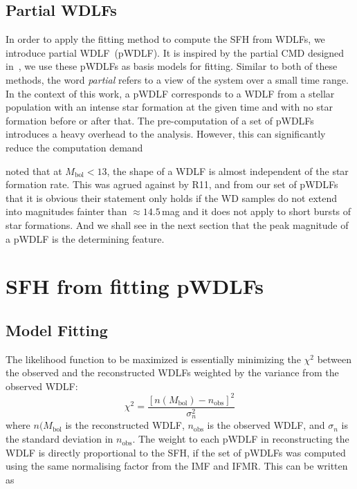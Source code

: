\documentclass[fleqn,usenatbib]{mnras}
\begin{document}
\subsection*{Partial WDLFs}
In order to apply the fitting method to compute the SFH from WDLFs, we introduce
partial WDLF~(pWDLF). It is inspired by the partial CMD designed
in~\citep{2006A&A...459..783C}, we use these pWDLFs as basis models
for fitting. Similar to both of these methods, the word \textit{partial} 
refers to a view of the system over a small time range. In the context of this
work, a pWDLF corresponds to a WDLF from a stellar population with an intense
star formation at the given time and with no star formation before or after
that. The pre-computation of a set of pWDLFs introduces a heavy overhead to the
analysis. However, this can significantly reduce the computation demand 

\citet{2008ApJ...682L.109I} noted that at $M_{\mathrm{bol}} < 13$, the shape of
a WDLF is almost independent of the star formation rate. This was agrued
against by R11, and from our set of pWDLFs that it is obvious their statement
only holds if the WD samples do not extend into magnitudes fainter than
$\approx14.5$\,mag and it does not apply to short bursts of star formations.
And we shall see in the next section that the peak magnitude of a pWDLF is the
determining feature.

\section{SFH from fitting pWDLFs}

\subsection{Model Fitting}
\label{sec:model_fitting}
The likelihood function to be maximized is essentially minimizing the $\chi^2$
between the observed and the reconstructed WDLFs weighted by the variance from
the observed WDLF:
\begin{equation}
    \chi^2 = \frac{\left[n(M_\mathrm{bol}) - n_\mathrm{obs}\right]^2}{\sigma_n^2}
\end{equation}
where $n(M_\mathrm{bol}$ is the reconstructed WDLF, $n_\mathrm{obs}$ is the
observed WDLF, and $\sigma_n$ is the standard deviation in $n_\mathrm{obs}$.
The weight to each pWDLF in reconstructing the WDLF is directly proportional to
the SFH, if the set of pWDLFs was computed using the same normalising factor
from the IMF and IFMR. This can be written as
\end{document}
